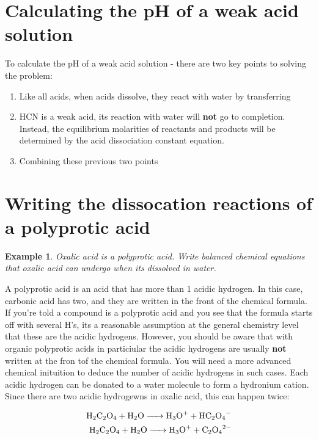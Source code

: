 \documentclass{article}  %
\newtheorem{exmp}{Example}
\begin{document}
\section*{Calculating the pH of a weak acid solution}
To calculate the pH of a weak acid solution - there are two key points to solving the problem: 
\begin{enumerate}
    \item Like all acids, when acids dissolve, they react with water by transferring  \\
    \item HCN is a weak acid, its reaction with water will \textbf{not} go to completion. Instead, the equilibrium molarities of reactants and products will be determined by the acid dissociation constant equation.
    \item Combining these previous two points 
\end{enumerate}

\section*{Writing the dissocation reactions of a polyprotic acid}
\begin{exmp}
    Oxalic acid  is a polyprotic acid. Write balanced chemical equations that oxalic acid can undergo when its dissolved in water. 
\end{exmp}
A polyprotic acid is an acid that has more than 1 acidic hydrogen. In this case, carbonic acid has two, and they are written in the front of the chemical formula.
\newline
If you're told a compound is a polyprotic acid and you see that the formula starts off with several H's, its a reasonable assumption at the general chemistry level that these are the acidic hydrogens.
\newline
However, you should be aware that with organic polyprotic acids in particiular the acidic hydrogens are usually \textbf{not} written at the fron tof the chemical formula. You will need a more advanced chemical inituition to deduce the number of acidic hydrogens in such cases.
\newline
Each acidic hydrogen can be donated to a water molecule to form a hydronium cation. Since there are two acidic hydrogewns in oxalic acid, this can happen twice:

\begin{equation*}
    \begin{aligned}
        \ce{H2C2O4 + H2O -> H3O+ + HC2O4-} \\
        \ce{H2C2O4 + H2O -> H3O+ + C2O4^2-}
    \end{aligned}
\end{equation*}
\end{document}
